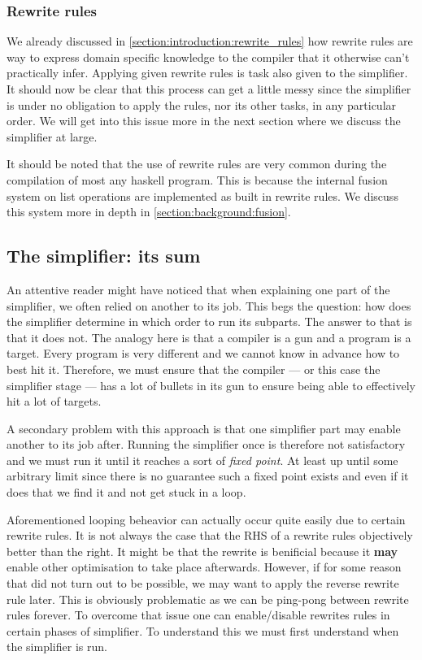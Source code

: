 \subsubsection{Rewrite rules}

We already discussed in \cref{section:introduction:rewrite_rules} how rewrite rules are way to express domain
specific knowledge to the compiler that it otherwise can't practically infer. Applying given rewrite rules is task
also given to the simplifier. It should now be clear that this process can get a little messy since the simplifier
is under no obligation to apply the rules, nor its other tasks, in any particular order. We will get into this issue
more in the next section where we discuss the simplifier at large.

It should be noted that the use of rewrite rules are very common during the compilation of most any haskell program.
This is because the internal fusion system on list operations are implemented as built in rewrite rules.
We discuss this system more in depth in \cref{section:background:fusion}.



\subsection{The simplifier: its sum}

An attentive reader might have noticed that when explaining one part of the simplifier, we often relied on another to
its job. This begs the question: how does the simplifier determine in which order to run its subparts. The answer to that is
that it does not. The analogy here is that a compiler is a gun and a program is a target. Every program is very different
and we cannot know in advance how to best hit it. Therefore, we must ensure that the compiler --- or this case the simplifier stage ---
has a lot of bullets in its gun to ensure being able to effectively hit a lot of targets. \cite{haskell_optimisations_1997}

A secondary problem with this approach is that one simplifier part may enable another to its job after. Running the simplifier
once is therefore not satisfactory and we must run it until it reaches a sort of \textit{fixed point}. At least up until some
arbitrary limit since there is no guarantee such a fixed point exists and even if it does that we find it and not get stuck in a loop.

Aforementioned looping beheavior can actually occur quite easily due to certain rewrite rules. It is not always the case that
the RHS of a rewrite rules objectively better than the right. It might be that the rewrite is benificial because it \textbf{may}
enable other optimisation to take place afterwards. However, if for some reason that did not turn out to be possible, we may want
to apply the reverse rewrite rule later. This is obviously problematic as we can be ping-pong between rewrite rules forever.
To overcome that issue one can enable/disable rewrites rules in certain phases of simplifier. To understand this we must first
understand when the simplifier is run.

